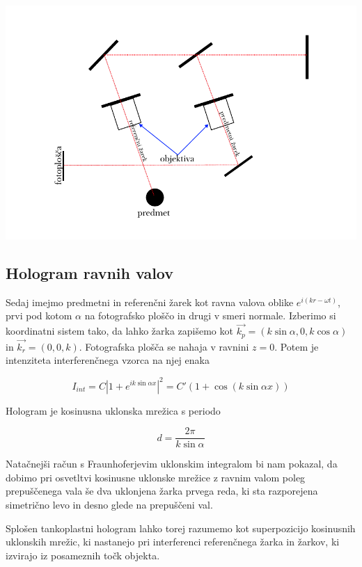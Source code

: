 \documentclass[11pt]{article}
\begin{document}
\begin{center}\label{fig:1}
\includegraphics[width=.9\linewidth]{predmet.pdf}
\end{center}
\subsection{Hologram ravnih valov}
\label{sec:org2e856b7}

Sedaj imejmo predmetni in referenčni žarek kot ravna valova oblike \(e^{i(kr - \omega t)}\), prvi pod kotom \(\alpha\) na fotografsko ploščo in drugi v smeri normale. Izberimo si koordinatni sistem tako, da lahko žarka zapišemo kot \(\vec{k_p} = (k \sin \alpha, 0, k \cos \alpha)\) in \(\vec{k_r} = (0, 0, k)\).
Fotografska plošča se nahaja v ravnini \(z = 0\). Potem je intenziteta interferenčnega vzorca na njej enaka

\begin{equation}
\label{eq:5}
I_{int} = C \left| 1 + e^{ik \sin \alpha x} \right| ^2 = C' (1 + \cos(k\sin \alpha x))
\end{equation}

Hologram je kosinusna uklonska mrežica s periodo

\begin{equation}
\label{eq:6}
d = \frac{2 \pi}{k \sin \alpha}
\end{equation}

Natačnejši račun s Fraunhoferjevim uklonskim integralom bi nam pokazal, da dobimo pri osvetltvi kosinusne uklonske mrežice z ravnim valom poleg prepuščenega vala še dva uklonjena žarka prvega reda, ki sta razporejena simetrično levo in desno glede na prepuščeni val.

Splošen tankoplastni hologram lahko torej razumemo kot superpozicijo kosinusnih uklonskih mrežic, ki nastanejo pri interferenci referenčnega žarka in žarkov, ki izvirajo iz posameznih točk objekta.
\end{document}
